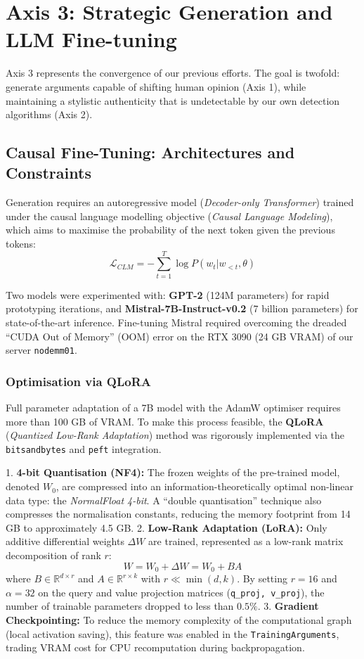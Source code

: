 \documentclass[11pt,a4paper]{article}
\begin{document}
\section{Axis 3: Strategic Generation and LLM Fine-tuning}

Axis 3 represents the convergence of our previous efforts. The goal is twofold:
generate arguments capable of shifting human opinion (Axis 1), while
maintaining a stylistic authenticity that is undetectable by our own detection
algorithms (Axis 2).

\subsection{Causal Fine-Tuning: Architectures and Constraints}
Generation requires an autoregressive model (\textit{Decoder-only Transformer})
trained under the causal language modelling objective (\textit{Causal Language
Modeling}), which aims to maximise the probability of the next token given the
previous tokens:
\begin{equation}
    \mathcal{L}_{CLM} = -\sum_{t=1}^T \log P(w_t | w_{<t}, \theta)
\end{equation}

Two models were experimented with: \textbf{GPT-2} (124M parameters) for rapid
prototyping iterations, and \textbf{Mistral-7B-Instruct-v0.2} (7 billion
parameters) for state-of-the-art inference. Fine-tuning Mistral required
overcoming the dreaded ``CUDA Out of Memory'' (OOM) error on the RTX 3090
(24 GB VRAM) of our server \texttt{nodemm01}.

\subsubsection{Optimisation via QLoRA}
Full parameter adaptation of a 7B model with the AdamW optimiser requires more
than 100 GB of VRAM. To make this process feasible, the \textbf{QLoRA}
(\textit{Quantized Low-Rank Adaptation}) method was rigorously implemented
via the \texttt{bitsandbytes} and \texttt{peft} integration.

1. \textbf{4-bit Quantisation (NF4):} The frozen weights of the pre-trained
model, denoted $W_0$, are compressed into an information-theoretically optimal
non-linear data type: the \textit{NormalFloat 4-bit}. A ``double quantisation''
technique also compresses the normalisation constants, reducing the memory
footprint from 14 GB to approximately 4.5 GB.
2. \textbf{Low-Rank Adaptation (LoRA):} Only additive differential weights
$\Delta W$ are trained, represented as a low-rank matrix decomposition of
rank $r$:
\begin{equation}
    W = W_0 + \Delta W = W_0 + B A
\end{equation}
where $B \in \mathbb{R}^{d \times r}$ and $A \in \mathbb{R}^{r \times k}$
with $r \ll \min(d, k)$. By setting $r=16$ and $\alpha=32$ on the query and
value projection matrices (\texttt{q\_proj, v\_proj}), the number of trainable
parameters dropped to less than $0.5\%$.
3. \textbf{Gradient Checkpointing:} To reduce the memory complexity of the
computational graph (local activation saving), this feature was enabled in the
\texttt{TrainingArguments}, trading VRAM cost for CPU recomputation during
backpropagation.
\end{document}
